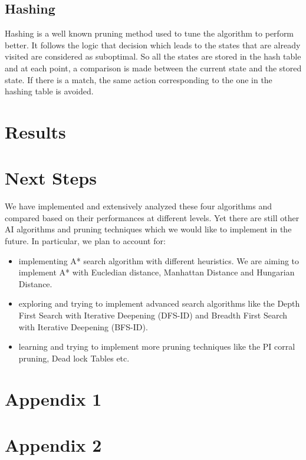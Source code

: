 \documentclass[10pt, final]{article}
\begin{document}
\subsection{Hashing}
Hashing is a well known pruning method used to tune the algorithm to perform better. It follows the logic that decision which leads to the states that are already visited are considered as suboptimal. So all the states are stored in the hash table and at each point, a comparison is made between the current state and the stored state. If there is a match, the same action corresponding to the one in the hashing table is avoided.
\section{Results}
\section{Next Steps}
We have implemented and extensively analyzed these four algorithms and compared based on their performances at different levels. Yet there are still other AI algorithms and pruning techniques which we would like to implement in the future. In particular, we plan to account for:
\begin{itemize}
\item implementing A* search algorithm with different heuristics. We are aiming to implement A* with Eucledian distance, Manhattan Distance and Hungarian Distance.
\item exploring and trying to implement advanced search algorithms like the Depth First Search with Iterative Deepening (DFS-ID) and Breadth First Search with Iterative Deepening (BFS-ID).
\item learning and trying to implement more pruning techniques like the PI corral pruning, Dead lock Tables etc. 
\end{itemize}

\newpage

\section{Appendix 1}


\newpage

\section{Appendix 2}
\end{document}
